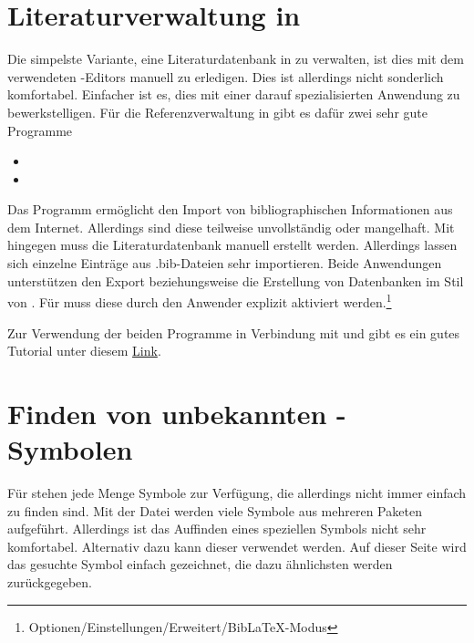 \section{Literaturverwaltung in }
%
%
Die simpelste Variante, eine Literaturdatenbank in  zu verwalten, 
ist dies mit dem verwendeten -Editors manuell zu erledigen. Dies 
ist allerdings nicht sonderlich komfortabel. Einfacher ist es, dies mit einer 
darauf spezialisierten Anwendung zu bewerkstelligen. Für die Referenzverwaltung 
in  gibt es dafür zwei sehr gute Programme
%
\begin{itemize}
\item {}
\item {}
\end{itemize}
%
Das Programm  ermöglicht den Import von bibliographischen 
Informationen aus dem Internet. Allerdings sind diese teilweise unvollständig 
oder mangelhaft. Mit  hingegen muss die Literaturdatenbank 
manuell erstellt werden. Allerdings lassen sich einzelne Einträge aus 
.bib-Dateien sehr importieren. Beide Anwendungen unterstützen den Export 
beziehungsweise die Erstellung von Datenbanken im Stil von . 
Für  muss diese durch den Anwender explizit aktiviert 
werden.\footnote{Optionen/Einstellungen/Erweitert/BibLaTeX-Modus}

Zur Verwendung der beiden Programme in Verbindung mit  und 
 gibt es ein gutes Tutorial unter diesem
\href{http://www.suedraum.de/latex/stammtisch/degenkolb_latex_biblatex_folien-final.pdf}{Link}.



\section{Finden von unbekannten -Symbolen}
Für  stehen jede Menge Symbole zur Verfügung, die allerdings 
nicht immer einfach zu finden sind. Mit der Datei  werden 
viele Symbole aus mehreren Paketen aufgeführt. Allerdings ist das Auffinden 
eines speziellen Symbols nicht sehr komfortabel. Alternativ dazu kann dieser 
 verwendet werden. Auf 
dieser Seite wird das gesuchte Symbol einfach gezeichnet, die dazu ähnlichsten 
werden zurückgegeben.



